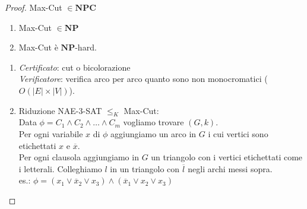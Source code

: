 \documentclass[a4paper]{article}
\theoremstyle{definition}
\newcommand{\np}{\mathbf{NP}}
\newcommand{\npc}{\mathbf{NPC}}
\begin{document}
		\begin{proof}
			Max-Cut $ \in \npc $
			\begin{enumerate}
				\item Max-Cut $ \in \np $
				\item Max-Cut è $ \np$-hard.
			\end{enumerate}
			\begin{enumerate}
				\item \textit{Certificato}: cut o bicolorazione\\
					  \textit{Verificatore}: verifica arco per arco quanto sono non monocromatici ($ O(|E|\times|V|) $).
				\item Riduzione NAE-3-SAT $ \leq_K $ Max-Cut:\\
				Data $ \phi = C_1 \wedge C_2 \wedge \dots \wedge C_m $ vogliamo trovare $ (G, k) $.\\
				Per ogni variabile $ x $ di $ \phi $ aggiungiamo un arco in $ G $ i cui vertici sono etichettati $ x $ e $ \overline{x} $.\\				
				Per ogni clausola aggiungiamo in $ G $ un triangolo con i vertici etichettati come i letterali. Colleghiamo $ l $ in un triangolo con $ \overline{l} $ negli archi messi sopra.\\
				es.: $ \phi = (x_1 \vee \overline{x}_2 \vee x_3) \wedge (\overline{x}_1 \vee x_2 \vee x_3) $
				

\end{enumerate}
\end{proof}
\end{document}
